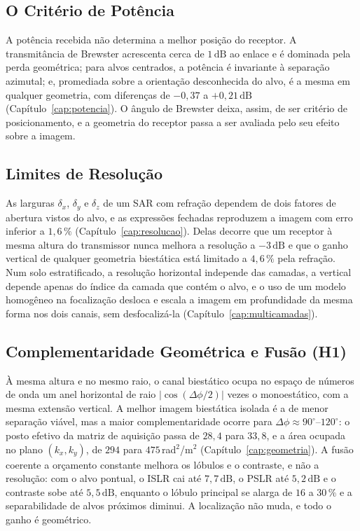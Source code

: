 \documentclass[12pt,a4paper,oneside]{book}
\theoremstyle{remark}
\newcommand{\dB}{\,\mathrm{dB}}
\theoremstyle{plain}
\theoremstyle{definition}
\begin{document}
\subsection{O Critério de Potência}

A potência recebida não determina a melhor posição do receptor. A transmitância de
Brewster acrescenta cerca de $1\dB$ ao enlace e é dominada pela perda geométrica;
para alvos centrados, a potência é invariante à separação azimutal; e, promediada
sobre a orientação desconhecida do alvo, é a mesma em qualquer geometria, com
diferenças de $-0,37$ a $+0,21\dB$ (Capítulo~\ref{cap:potencia}). O ângulo de
Brewster deixa, assim, de ser critério de posicionamento, e a geometria do receptor
passa a ser avaliada pelo seu efeito sobre a imagem.

\subsection{Limites de Resolução}

As larguras $\delta_x$, $\delta_y$ e $\delta_z$ de um SAR com refração dependem de
dois fatores de abertura vistos do alvo, e as expressões fechadas reproduzem a
imagem com erro inferior a $1,6\,\%$ (Capítulo~\ref{cap:resolucao}). Delas decorre
que um receptor à mesma altura do transmissor nunca melhora a resolução a $-3\dB$ e
que o ganho vertical de qualquer geometria biestática está limitado a $4,6\,\%$
pela refração. Num solo estratificado, a resolução horizontal independe das
camadas, a vertical depende apenas do índice da camada que contém o alvo, e o uso
de um modelo homogêneo na focalização desloca e escala a imagem em profundidade da
mesma forma nos dois canais, sem desfocalizá-la (Capítulo~\ref{cap:multicamadas}).

\subsection{Complementaridade Geométrica e Fusão (H1)}

À mesma altura e no mesmo raio, o canal biestático ocupa no espaço de números de
onda um anel horizontal de raio $|\cos(\Delta\phi/2)|$ vezes o monoestático, com a
mesma extensão vertical. A melhor imagem biestática isolada é a de menor separação
viável, mas a maior complementaridade ocorre para
$\Delta\phi\approx90^\circ$--$120^\circ$: o posto efetivo da matriz de aquisição
passa de $28,4$ para $33,8$, e a área ocupada no plano $(k_x,k_y)$, de $294$ para
$475\,$rad$^2$/m$^2$ (Capítulo~\ref{cap:geometria}). A fusão coerente a orçamento
constante melhora os lóbulos e o contraste, e não a resolução: com o alvo pontual, o
ISLR cai até $7,7\dB$, o PSLR até $5,2\dB$ e o contraste sobe até $5,5\dB$, enquanto o
lóbulo principal se alarga de $16$ a $30\,\%$ e a separabilidade de alvos próximos
diminui. A localização não muda, e todo o ganho é geométrico.
\end{document}
